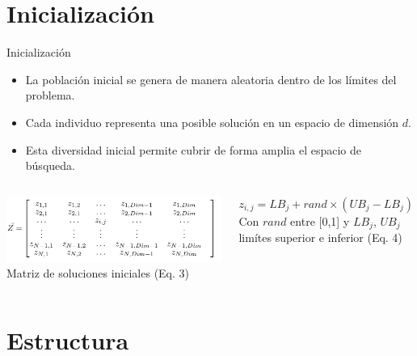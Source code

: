\documentclass[12pt]{beamer}
\begin{document}
\section{Inicialización}
\begin{frame}{Inicialización}
    \justifying
    \begin{itemize}
        \item La población inicial se genera de manera aleatoria dentro de los límites del problema.
        \item Cada individuo representa una posible solución en un espacio de dimensión $d$.
        \item Esta diversidad inicial permite cubrir de forma amplia el espacio de búsqueda.
    \end{itemize}

    \vspace{0.5em}
    \begin{columns}[c]
            \centering
            \includegraphics[width=0.9\linewidth]{Ecuacion3.png}
            \vspace{0.3em}
            {\scriptsize Matriz de soluciones iniciales (Eq. 3)}

            \begin{equation*}
                z_{i,j} = LB_j + rand \times (UB_j - LB_j)
            \end{equation*}
            \vspace{0.3em}
            \small
            {\scriptsize Con $rand$ entre [0,1] y $LB_j$, $UB_j$ limítes superior e inferior  (Eq. 4)}
    \end{columns}
\end{frame}

\section{Estructura}
\end{document}
